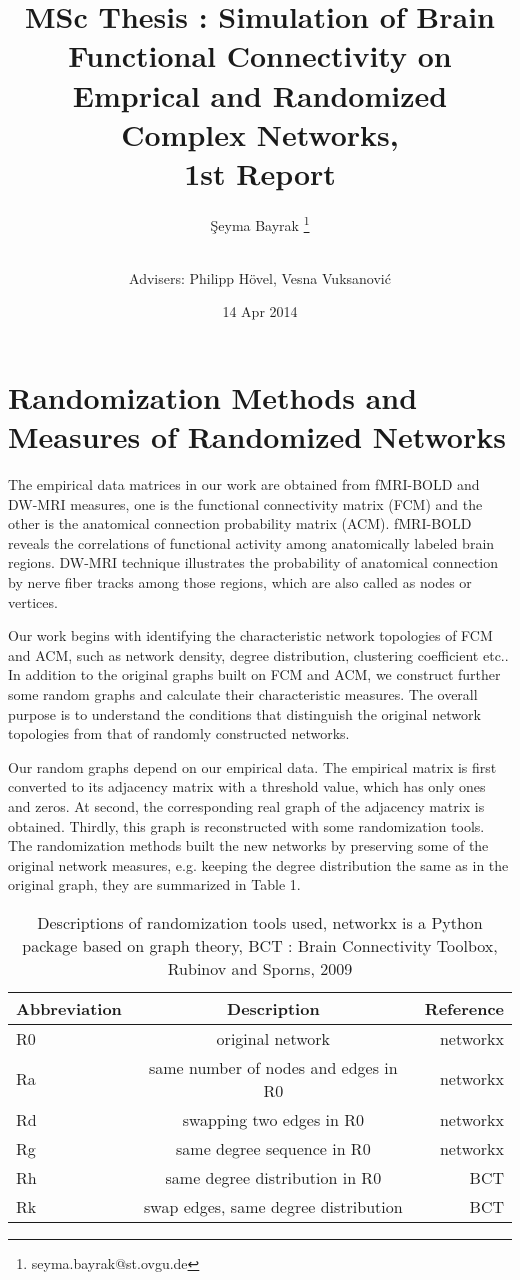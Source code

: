 \documentclass[12pt]{article}
\title{MSc Thesis : Simulation of Brain Functional Connectivity on Emprical and Randomized Complex Networks, \\ 1st Report}
\author[1]{\c{S}eyma Bayrak \thanks{seyma.bayrak@st.ovgu.de}}
\author[ ]{\\ Advisers: Philipp H\"{o}vel, Vesna Vuksanovi\'c}
\affil[1]{\footnotesize{Integrative Neuroscience MSc, Otto von Guericke University, Magdeburg}}
\date{14 Apr 2014}
\begin{document}
   \maketitle
   

	\section{Randomization Methods and Measures of Randomized Networks}	

The empirical data matrices in our work are obtained from fMRI-BOLD and DW-MRI measures, one is the functional connectivity matrix (FCM) and the other is the anatomical connection probability matrix (ACM). fMRI-BOLD reveals the correlations of functional activity among anatomically labeled brain regions. DW-MRI technique illustrates the  probability of anatomical connection by nerve fiber tracks among those regions, which are also called as nodes or vertices.   

Our work begins with identifying the characteristic network topologies of FCM and ACM, such as network density, degree distribution, clustering coefficient etc.. In addition to the original graphs built on FCM and ACM, we construct further some random graphs and calculate their characteristic measures. The overall purpose is to understand the conditions that distinguish the original network topologies from that of randomly constructed networks.    

Our random graphs depend on our empirical data. The empirical matrix is first converted to its adjacency matrix with a threshold value, which has only ones and zeros. At second, the corresponding real graph of the adjacency matrix is obtained. Thirdly, this graph is reconstructed with some randomization tools. The randomization methods built the new networks by preserving some of the original network measures, e.g. keeping the degree distribution the same as in the original graph, they are summarized in Table 1.

\begin{table}
\begin{center}
\begin{tabular}{ l | c | r }
  Abbreviation & Description & Reference \\
  \hline  \hline                     
  R0 & original network						  & networkx \\ \hline
  Ra & same number of nodes and edges in R0   & networkx \\ \hline
  Rd & swapping two edges in R0 			  & networkx \\ \hline
  Rg & same degree sequence in R0			  & networkx \\ \hline
  Rh & same degree distribution in R0		  & BCT 	 \\ \hline
  Rk & swap edges, same degree distribution	  & BCT 	 \\ \hline  
  \hline  
\end{tabular}
\caption[Table caption text]{Descriptions of randomization tools used, networkx is a Python package based on graph theory, BCT : Brain Connectivity Toolbox, Rubinov and Sporns, 2009}
\end{center}
\end{table}	
\end{document}
